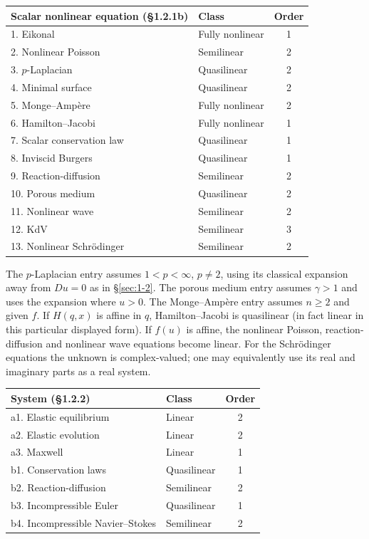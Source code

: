 \begin{center}\small
\begin{tabular}{@{}llc@{}}
\textbf{Scalar nonlinear equation (\S1.2.1b)}&\textbf{Class}&\textbf{Order}\\\hline
1. Eikonal & Fully nonlinear & 1\\
2. Nonlinear Poisson & Semilinear & 2\\
3. $p$-Laplacian & Quasilinear & 2\\
4. Minimal surface & Quasilinear & 2\\
5. Monge--Ampère & Fully nonlinear & 2\\
6. Hamilton--Jacobi & Fully nonlinear & 1\\
7. Scalar conservation law & Quasilinear & 1\\
8. Inviscid Burgers & Quasilinear & 1\\
9. Reaction-diffusion & Semilinear & 2\\
10. Porous medium & Quasilinear & 2\\
11. Nonlinear wave & Semilinear & 2\\
12. KdV & Semilinear & 3\\
13. Nonlinear Schrödinger & Semilinear & 2
\end{tabular}
\end{center}
\par\Needspace{65mm}

The $p$-Laplacian entry assumes $1<p<\infty$, $p\ne2$, using its
classical expansion away from $Du=0$ as in \S\ref{sec:1-2}.
The porous medium entry assumes $\gamma>1$ and uses the expansion where
$u>0$. The Monge--Ampère entry assumes $n\geq2$ and given $f$.
If $H(q,x)$ is affine in $q$, Hamilton--Jacobi is quasilinear (in fact
linear in this particular displayed form). If $f(u)$ is affine, the
nonlinear Poisson, reaction-diffusion and nonlinear wave equations become
linear. For the Schrödinger equations the unknown is complex-valued; one
may equivalently use its real and imaginary parts as a real system.

\begin{center}\small
\begin{tabular}{@{}llc@{}}
\textbf{System (\S1.2.2)}&\textbf{Class}&\textbf{Order}\\\hline
a1. Elastic equilibrium & Linear & 2\\
a2. Elastic evolution & Linear & 2\\
a3. Maxwell & Linear & 1\\
b1. Conservation laws & Quasilinear & 1\\
b2. Reaction-diffusion & Semilinear & 2\\
b3. Incompressible Euler & Quasilinear & 1\\
b4. Incompressible Navier--Stokes & Semilinear & 2
\end{tabular}
\end{center}

